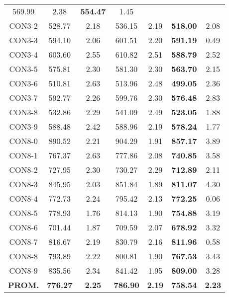 \begin{table}[ht]
\begin{tabular}{c c c c c c c}
569.99 & 2.38 & \bf{554.47} & 
1.45\\CON3-2 & 528.77 & 2.18 & 
536.15 & 2.19 & \bf{518.00} & 
2.08\\CON3-3 & 594.10 & 2.06 & 
601.51 & 2.20 & \bf{591.19} & 
0.49\\CON3-4 & 603.60 & 2.55 & 
610.82 & 2.51 & \bf{588.79} & 
2.52\\CON3-5 & 575.81 & 2.30 & 
581.30 & 2.30 & \bf{563.70} & 
2.15\\CON3-6 & 510.81 & 2.63 & 
513.96 & 2.48 & \bf{499.05} & 
2.36\\CON3-7 & 592.77 & 2.26 & 
599.76 & 2.30 & \bf{576.48} & 
2.83\\CON3-8 & 532.86 & 2.29 & 
541.09 & 2.49 & \bf{523.05} & 
1.88\\CON3-9 & 588.48 & 2.42 & 
588.96 & 2.19 & \bf{578.24} & 
1.77\\CON8-0 & 890.52 & 2.21 & 
904.29 & 1.91 & \bf{857.17} & 
3.89\\CON8-1 & 767.37 & 2.63 & 
777.86 & 2.08 & \bf{740.85} & 
3.58\\CON8-2 & 727.95 & 2.30 & 
730.27 & 2.29 & \bf{712.89} & 
2.11\\CON8-3 & 845.95 & 2.03 & 
851.84 & 1.89 & \bf{811.07} & 
4.30\\CON8-4 & 772.73 & 2.24 & 
795.42 & 2.13 & \bf{772.25} & 
0.06\\CON8-5 & 778.93 & 1.76 & 
814.13 & 1.90 & \bf{754.88} & 
3.19\\CON8-6 & 701.44 & 1.87 & 
709.59 & 2.07 & \bf{678.92} & 
3.32\\CON8-7 & 816.67 & 2.19 & 
830.79 & 2.16 & \bf{811.96} & 
0.58\\CON8-8 & 793.89 & 2.22 & 
800.81 & 1.90 & \bf{767.53} & 
3.43\\CON8-9 & 835.56 & 2.34 & 
841.42 & 1.95 & \bf{809.00} & 
3.28\\\bf{PROM.} & 
\bf{776.27} & \bf{2.25} & \bf{786.90} & \bf{2.19} & \bf{758.54} & \bf{2.23}\\[1ex]\hline
\end{tabular}
\label{table:nonlin}
\end{table} \clearpage
